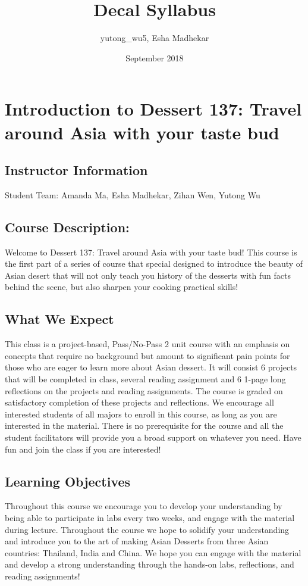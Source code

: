 \documentclass{article}
\title{Decal Syllabus}
\author{yutong_wu5, Esha Madhekar}
\date{September 2018}
\begin{document}
\maketitle

\section{Introduction to Dessert 137: Travel around Asia with your taste bud}



\subsection{Instructor Information}
Student Team: Amanda Ma, Esha Madhekar, Zihan Wen, Yutong Wu


\subsection{Course Description:}
Welcome to Dessert 137: Travel around Asia with your taste bud! This course is the first part of a series of course that special designed to introduce the beauty of Asian desert that will not only teach you history of the desserts with fun facts behind the scene, but also sharpen your cooking practical skills!

\subsection{What We Expect}
This class is a project-based, Pass/No-Pass 2 unit course with an emphasis on concepts that require no background but amount to significant pain points for those who are eager to learn more about Asian dessert. It will consist 6 projects that will be completed in class, several reading assignment and 6 1-page long reflections on the projects and reading assignments. The course is graded on satisfactory completion of these projects and reflections.
We encourage all interested students of all majors to enroll in this course, as long as you are interested in the material. There is no prerequisite for the course and all the student facilitators will provide you a broad support on whatever you need. Have fun and join the class if you are interested!

\subsection{Learning Objectives}
Throughout this course we encourage you to develop your understanding by being able to participate in labs every two weeks, and engage with the material during lecture. Throughout the course we hope to solidify your understanding and introduce you to the art of making Asian Desserts from three Asian countries: Thailand, India and China. We hope you can engage with the material and develop a strong understanding through the hands-on labs, reflections, and reading assignments!
\end{document}

